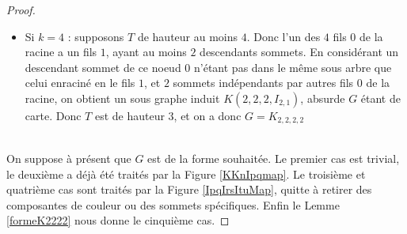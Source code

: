 \documentclass{scrartcl}
\begin{document}
\begin{flushleft}
\begin{proof}
\begin{itemize}
        \item Si $k = 4$ : supposons $T$ de hauteur au moins $4$. Donc l'un des $4$ fils $0$ de la racine a un fils $1$, ayant au moins
        $2$ descendants sommets. En considérant un descendant sommet de ce noeud $0$ n'étant pas dans le même sous arbre que celui
        enraciné en le fils $1$, et $2$ sommets indépendants par autres fils $0$ de la racine, on obtient un sous graphe induit
        $K(2,2,2,I_{2,1})$, absurde $G$ étant de carte. Donc $T$ est de hauteur $3$, et on a donc $G = K_{2,2,2,2}$
        \\~\\
    \end{itemize}
    On suppose à présent que $G$ est de la forme souhaitée. Le premier cas est trivial, le deuxième a déjà été traités par la Figure
    \ref{KKnIpqmap}. Le troisième et quatrième cas sont traités par la Figure \ref{IpqIrsItuMap}, quitte à retirer des composantes de
    couleur ou des sommets spécifiques. Enfin le Lemme \ref{formeK2222} nous donne le cinquième cas.
\end{proof}


\end{flushleft}
\end{document}
